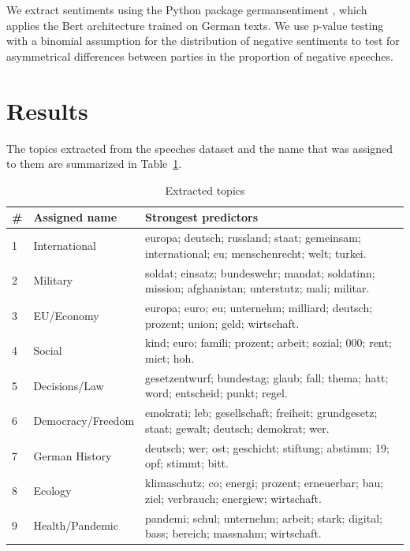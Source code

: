 \documentclass{article}
\begin{document}
We extract sentiments using the Python package germansentiment \cite{Germansentiment}, which applies the Bert architecture trained on German texts.
We use p-value testing with a binomial assumption for the distribution of negative sentiments to test for asymmetrical differences between parties in the proportion of negative speeches.

\section{Results}
The topics extracted from the speeches dataset and the name that was assigned to them are summarized in Table~\ref{topics_table}.
\begin{table}
  \captionsetup{width=0.9\linewidth}
  \caption{Extracted topics}
  \label{topics_table}
  \centering
  \begin{tabular}{p{0.02\linewidth} | p{0.2\linewidth} | p{0.78\linewidth}}
    \toprule
    \# & Assigned name & Strongest predictors \\
    \midrule
    1 & International & europa; deutsch; russland; staat; gemeinsam; international; eu; menschenrecht; welt; turkei. \\
    2 & Military & soldat; einsatz; bundeswehr; mandat; soldatinn; mission; afghanistan; unterstutz; mali; militar. \\
    3 & EU/Economy & europa; euro; eu; unternehm; milliard; deutsch; prozent; union; geld; wirtschaft. \\
    4 & Social & kind; euro; famili; prozent; arbeit; sozial; 000; rent; miet; hoh. \\
    5 & Decisions/Law & gesetzentwurf; bundestag; glaub; fall; thema; hatt; word; entscheid; punkt; regel. \\
    6 & Democracy/Freedom & emokrati; leb; gesellschaft; freiheit; grundgesetz; staat; gewalt; deutsch; demokrat; wer. \\
    7 & German History & deutsch; wer; ost; geschicht; stiftung; abstimm; 19; opf; stimmt; bitt. \\
    8 & Ecology & klimaschutz; co; energi; prozent; erneuerbar; bau; ziel; verbrauch; energiew; wirtschaft. \\
    9 & Health/Pandemic & pandemi; schul; unternehm; arbeit; stark; digital; bass; bereich; massnahm; wirtschaft. \\
    \bottomrule
  \end{tabular}
\end{table}
\end{document}
